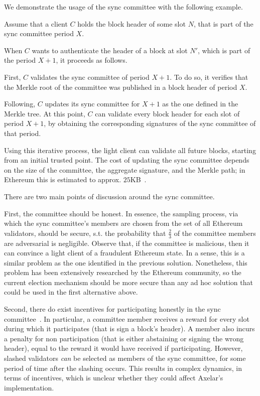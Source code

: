 We demonstrate the usage of the sync committee with the following example.

Assume that a client $C$ holds the block header of some slot $N$, that is part
of the sync committee period $X$.

When $C$ wants to authenticate the header of a block at slot $N'$, which is
part of the period $X+1$, it proceeds as follows.

First, $C$ validates the sync committee of period $X+1$. To do so, it verifies
that the Merkle root of the committee was published in a block header of period
$X$.

Following, $C$ updates its sync committee for $X+1$ as the one defined in the
Merkle tree. At this point, $C$ can validate every block header for each slot
of period $X+1$, by obtaining the corresponding signatures of the sync
committee of that period.

Using this iterative process, the light client can validate all future blocks,
starting from an initial trusted point. The cost of updating the sync committee
depends on the size of the committee, the aggregate signature, and the Merkle
path; in Ethereum this is estimated to approx. $25$KB~\cite{sync-committee}.

There are two main points of discussion around the sync committee.

First, the committee should be honest. In essence, the sampling process, via
which the sync committee's members are chosen from the set of all Ethereum
validators, should be secure, s.t. the probability that $\frac{2}{3}$ of the
committee members are adversarial is negligible. Observe that, if the committee
is malicious, then it can convince a light client of a fraudulent Ethereum
state. In a sense, this is a similar problem as the one identified in the
previous solution. Nonetheless, this problem has been extensively researched by
the Ethereum community, so the current election mechanism should be more secure
than any ad hoc solution that could be used in the first alternative above.

Second, there do exist incentives for participating honestly in the sync
committee~\cite{sync-committee-incentives}. In particular, a committee member
receives a reward for every slot during which it participates (that is sign a
block's header). A member also incurs a penalty for non participation (that is
either abstaining or signing the wrong header), equal to the reward it would
have received if participating.
However, slashed validators \emph{can} be selected as members of the sync
committee, for some period of time after the slashing occurs. This results in
complex dynamics, in terms of incentives, which is unclear whether they could
affect Axelar's implementation.
